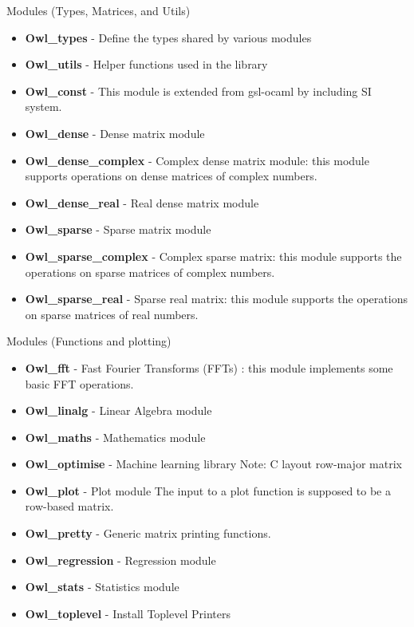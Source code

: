 \documentclass{beamer}
\begin{document}
\begin{frame}{Modules (Types, Matrices, and Utils)} 
\begin{itemize}
\item \textbf{Owl\_types} -  Define the types shared by various modules
\item \textbf{Owl\_utils} - Helper functions used in the library
 \item \textbf{Owl\_const} - This module is extended from gsl-ocaml by including SI system.
\item \textbf{Owl\_dense} - Dense matrix module
\item \textbf{Owl\_dense\_complex} - Complex dense matrix module: this module supports operations on dense matrices of complex numbers.
\item \textbf{Owl\_dense\_real} - Real dense matrix module
\item \textbf{Owl\_sparse} - Sparse matrix module
\item \textbf{Owl\_sparse\_complex} - Complex sparse matrix: this module supports the operations on sparse matrices of complex numbers.
\item \textbf{Owl\_sparse\_real} - Sparse real matrix: this module supports the operations on sparse matrices of real numbers.
\end{itemize}
\end{frame}

\begin{frame}{Modules (Functions and plotting)}
\begin{itemize}
\item \textbf{Owl\_fft} - Fast Fourier Transforms (FFTs) : this module implements some basic FFT operations.
\item \textbf{Owl\_linalg} - Linear Algebra module
\item \textbf{Owl\_maths} - Mathematics module
\item \textbf{Owl\_optimise} - Machine learning library Note: C layout row-major matrix
\item \textbf{Owl\_plot} - Plot module The input to a plot function is supposed to be a row-based matrix.
\item \textbf{Owl\_pretty} - Generic matrix printing functions.
\item \textbf{Owl\_regression} - Regression module
\item \textbf{Owl\_stats} - Statistics module
\item \textbf{Owl\_toplevel} - Install Toplevel Printers
\end{itemize}
\end{frame}
\end{document}
